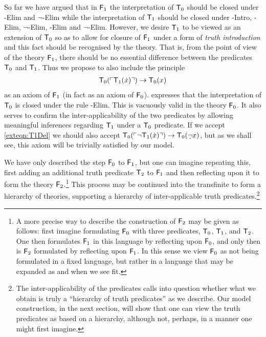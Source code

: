 \documentclass[UKenglish,cleveref,DIV=12]{scrartcl}
\theoremstyle{definition}
\theoremstyle{definition}
\begin{document}
So far we have argued that in $\mathsf{F}_1$ the interpretation of $\mathsf{T}_0$ should be
closed under -Elim and $\lnot$-Elim while the interpretation of
$\mathsf{T}_1$ should be closed under -Intro, -Elim, $\lnot$-Elim,
-Elim and $\lnot$-Elim. However, we desire $\mathsf{T}_1$ to be
viewed as an extension of $\mathsf{T}_0$ so as to allow for closure of $\mathsf{F}_1$ under a
form of {\em truth introduction} and this fact should be recognised by the
theory. That is, from the point of view of the theory $\mathsf{F}_1$, there should be no
essential difference between the predicates $\mathsf{T}_0$ and $\mathsf{T}_1$. Thus we propose to
also include the principle
\begin{gather}\label{exteqn:T1Del}
  \mathsf{T}_0(\ulcorner{\mathsf{T}_1(\dot x)}\urcorner)\rightarrow \mathsf{T}_0(x)
\end{gather}
as an axiom of $\mathsf{F}_1$ (in fact as an axiom of $\mathsf{F}_0$).
 expresses that the interpretation of $\mathsf{T}_0$ is closed under
the rule -Elim. This is vacuously valid in the theory $\mathsf{F}_0$. It also
serves to confirm the inter-applicability of the two predicates by allowing
meaningful inferences regarding $\mathsf{T}_1$ under a $\mathsf{T}_0$ predicate. If we accept
\cref{exteqn:T1Del} we should also accept $\T_0(\gn{\lnot \T_1(\dot x)})\rightarrow
\T_0(\dlnot x)$, but as we shall see, this axiom will be trivially satisfied by
our model.


We have only described the step $\mathsf{F}_0$ to $\mathsf{F}_1$, but one can imagine repeating
this, first adding an additional truth predicate $\mathsf{T}_2$ to $\mathsf{F}_1$ and then
reflecting upon it to form the theory $\mathsf{F}_2$.\footnote{A more precise
way to describe the construction of $\mathsf{F}_2$ may be given as follows: first imagine formulating $\mathsf{F}_0$
with three predicates, $\mathsf{T}_0$, $\mathsf{T}_1$, and $\mathsf{T}_2$. One then formulates $\mathsf{F}_1$ in this
language by reflecting upon $\mathsf{F}_0$, and only then is $\mathsf{F}_2$ formulated by reflecting
upon $\mathsf{F}_1$. In this sense we view $\mathsf{F}_0$ as not being formulated in a fixed
language, but rather in a language that may be expanded as and when we see fit.} This process may be
continued into the transfinite to form a hierarchy of theories, supporting a
hierarchy of inter-applicable truth predicates.\footnote{The inter-applicability
of the predicates calls into question whether what we obtain is truly a
``hierarchy of truth predicates'' as we describe. Our model construction, in the
next section, will show that one {can} view the truth predicates as based on
a hierarchy, although not, perhaps, in a manner one might first imagine.}
\end{document}
